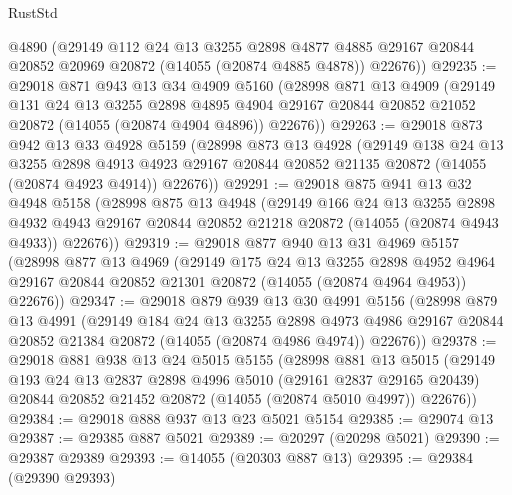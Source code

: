 \begin{lexlean}{RustStd}
\begin{coremodule}
      @4890
      (@29149
        @112
        @24
        @13
        @3255
        @2898
        @4877
        @4885
        @29167
        @20844
        @20852
        @20969
        @20872
        (@14055 (@20874 @4885 @4878))
        @22676))
@29235 := @29018
    @871
    @943
    @13
    @34
    @4909
    @5160
    (@28998
      @871
      @13
      @4909
      (@29149
        @131
        @24
        @13
        @3255
        @2898
        @4895
        @4904
        @29167
        @20844
        @20852
        @21052
        @20872
        (@14055 (@20874 @4904 @4896))
        @22676))
@29263 := @29018
    @873
    @942
    @13
    @33
    @4928
    @5159
    (@28998
      @873
      @13
      @4928
      (@29149
        @138
        @24
        @13
        @3255
        @2898
        @4913
        @4923
        @29167
        @20844
        @20852
        @21135
        @20872
        (@14055 (@20874 @4923 @4914))
        @22676))
@29291 := @29018
    @875
    @941
    @13
    @32
    @4948
    @5158
    (@28998
      @875
      @13
      @4948
      (@29149
        @166
        @24
        @13
        @3255
        @2898
        @4932
        @4943
        @29167
        @20844
        @20852
        @21218
        @20872
        (@14055 (@20874 @4943 @4933))
        @22676))
@29319 := @29018
    @877
    @940
    @13
    @31
    @4969
    @5157
    (@28998
      @877
      @13
      @4969
      (@29149
        @175
        @24
        @13
        @3255
        @2898
        @4952
        @4964
        @29167
        @20844
        @20852
        @21301
        @20872
        (@14055 (@20874 @4964 @4953))
        @22676))
@29347 := @29018
    @879
    @939
    @13
    @30
    @4991
    @5156
    (@28998
      @879
      @13
      @4991
      (@29149
        @184
        @24
        @13
        @3255
        @2898
        @4973
        @4986
        @29167
        @20844
        @20852
        @21384
        @20872
        (@14055 (@20874 @4986 @4974))
        @22676))
@29378 := @29018
    @881
    @938
    @13
    @24
    @5015
    @5155
    (@28998
      @881
      @13
      @5015
      (@29149
        @193
        @24
        @13
        @2837
        @2898
        @4996
        @5010
        (@29161 @2837 @29165 @20439)
        @20844
        @20852
        @21452
        @20872
        (@14055 (@20874 @5010 @4997))
        @22676))
@29384 := @29018 @888 @937 @13 @23 @5021 @5154
@29385 := @29074 @13
@29387 := @29385 @887 @5021
@29389 := @20297 (@20298 @5021)
@29390 := @29387 @29389
@29393 := @14055 (@20303 @887 @13)
@29395 := @29384 (@29390 @29393)

\end{coremodule}
\end{lexlean}
